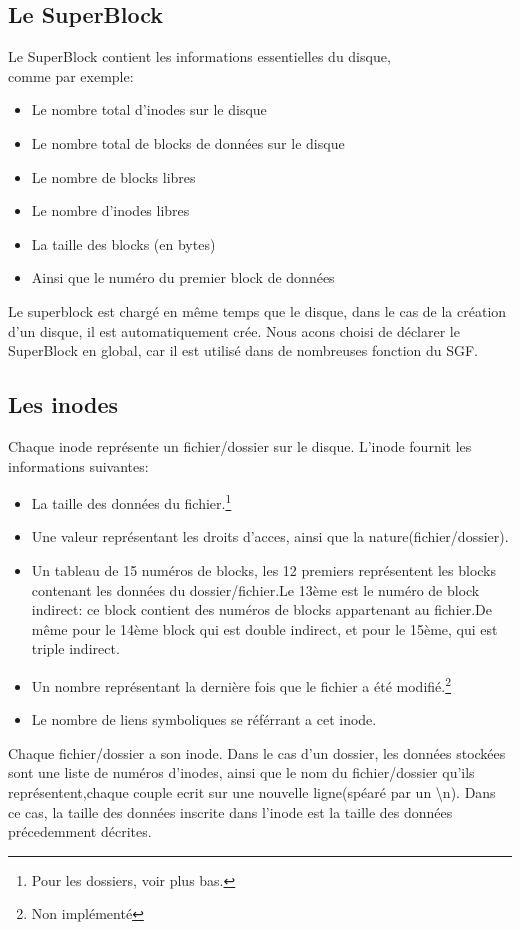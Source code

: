 \documentclass{report}
\begin{document}
\subsection*{Le SuperBlock}
Le SuperBlock contient les informations essentielles du disque,\\comme par exemple: 
\begin{itemize}
\item Le nombre total d'inodes sur le disque
\item Le nombre total de blocks de données sur le disque
\item Le nombre de blocks libres
\item Le nombre d'inodes libres
\item La taille des blocks (en bytes)
\item Ainsi que le numéro du premier block de données
\end{itemize}
Le superblock est chargé en même temps que le disque, dans le cas de la création d'un disque, il est automatiquement crée. Nous acons choisi de déclarer le SuperBlock en global, car il est utilisé dans de nombreuses fonction du SGF.
\subsection*{Les inodes}
Chaque inode représente un fichier/dossier sur le disque. L'inode fournit les informations suivantes:
\begin{itemize}
    \item La taille des données du fichier.\footnote{Pour les dossiers, voir plus bas.}
    \item Une valeur représentant les droits d'acces, ainsi que la nature(fichier/dossier).
    \item Un tableau de 15 numéros de blocks, les 12 premiers représentent les blocks contenant les données du dossier/fichier.Le 13ème est le numéro de block indirect: ce block contient des numéros de blocks appartenant au fichier.De même pour le 14ème block qui est double indirect, et pour le 15ème, qui est triple indirect.
    \item Un nombre représentant la dernière fois que le fichier a été modifié.\footnote{Non implémenté}
    \item Le nombre de liens symboliques se référrant a cet inode.
\end{itemize}
Chaque fichier/dossier a son inode. Dans le cas d'un dossier, les données stockées sont une liste de numéros d'inodes, ainsi que le nom du fichier/dossier qu'ils représentent,chaque couple ecrit sur une nouvelle ligne(spéaré par un \textbackslash n). Dans ce cas, la taille des données inscrite dans l'inode est la taille des données précedemment décrites.
\end{document}
